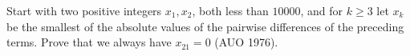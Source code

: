 Start with two positive integers $x_1, x_2$, both less than $10000$, and for $k \geq 3$ let $x_k$ be the smallest of the absolute values of the pairwise differences of the preceding terms. Prove that we always have $x_{21} = 0$ (AUO 1976).

